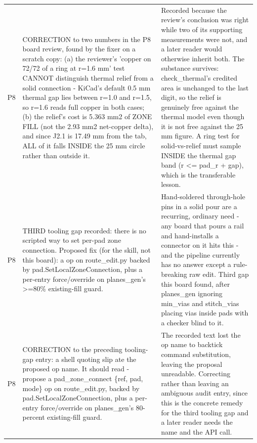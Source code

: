 \documentclass[11pt,a4paper]{article}
\begin{document}
{\begin{longtable}{lp{5.2cm}p{7.2cm}}
P8 & CORRECTION to two numbers in the P8 board review, found by the fixer on a scratch copy: (a) the reviewer's 'copper on 72/72 of a ring at r=1.6 mm' test CANNOT distinguish thermal relief from a solid connection - KiCad's default 0.5 mm thermal gap lies between r=1.0 and r=1.5, so r=1.6 reads full copper in both cases; (b) the relief's cost is 5.363 mm2 of ZONE FILL (not the 2.93 mm2 net-copper delta), and since J2.1 is 17.49 mm from the tab, ALL of it falls INSIDE the 25 mm circle rather than outside it. & Recorded because the review's conclusion was right while two of its supporting measurements were not, and a later reader would otherwise inherit both. The substance survives: check\_thermal's credited area is unchanged to the last digit, so the relief is genuinely free against the thermal model even though it is not free against the 25 mm figure. A ring test for solid-vs-relief must sample INSIDE the thermal gap band (r \textless{}= pad\_r + gap), which is the transferable lesson. \\
P8 & THIRD tooling gap recorded: there is no scripted way to set per-pad zone connection. Proposed fix (for the skill, not this board): a  op on route\_edit.py backed by pad.SetLocalZoneConnection, plus a per-entry force/override on planes\_gen's \textgreater{}=80\% existing-fill guard. & Hand-soldered through-hole pins in a solid pour are a recurring, ordinary need - any board that pours a rail and hand-installs a connector on it hits this - and the pipeline currently has no answer except a rule-breaking raw edit. Third gap this board found, after planes\_gen ignoring min\_vias and stitch\_vias placing vias inside pads with a checker blind to it. \\
P8 & CORRECTION to the preceding tooling-gap entry: a shell quoting slip ate the proposed op name. It should read - propose a pad\_zone\_connect \{ref, pad, mode\} op on route\_edit.py, backed by pad.SetLocalZoneConnection, plus a per-entry force/override on planes\_gen's 80-percent existing-fill guard. & The recorded text lost the op name to backtick command substitution, leaving the proposal unreadable. Correcting rather than leaving an ambiguous audit entry, since this is the concrete remedy for the third tooling gap and a later reader needs the name and the API call. \\

\end{longtable}}
\end{document}
